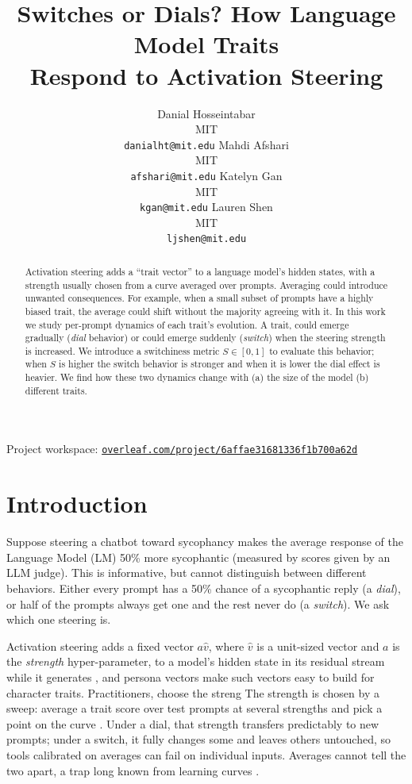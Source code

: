\documentclass{article}
\title{Switches or Dials? How Language Model Traits\\Respond to Activation Steering}
\date{}
\author{
  Danial Hosseintabar \\ MIT \\ \texttt{danialht@mit.edu}
  \And
  Mahdi Afshari \\ MIT \\ \texttt{afshari@mit.edu}
  \And
  Katelyn Gan \\ MIT \\ \texttt{kgan@mit.edu}
  \And
  Lauren Shen \\ MIT \\ \texttt{ljshen@mit.edu}
}
\begin{document}
\maketitle
\begin{center}\small Project workspace: \href{https://www.overleaf.com/project/6affae31681336f1b700a62d/share\#cf8fa3ce9a988f6a2a5c88ddf9eea1c586d020f3416d6e69}{\texttt{overleaf.com/project/6affae31681336f1b700a62d}}\end{center}\vspace{0.5em}




\begin{abstract}
Activation steering adds a ``trait vector'' to a language model's hidden states, with a strength usually chosen from a curve averaged over prompts. Averaging could introduce unwanted consequences. For example, when a small subset of prompts have a highly biased trait, the average could shift without the majority agreeing with it. In this work we study per-prompt dynamics of each trait's evolution.
A trait, could emerge gradually (\emph{dial} behavior) or could emerge suddenly (\emph{switch}) when the steering strength is increased.
We introduce a switchiness metric $S\in[0,1]$ to evaluate this behavior; when $S$ is higher the switch behavior is stronger and when it is lower the dial effect is heavier. We find how these two dynamics change with (a) the size of the model (b) different traits.
\end{abstract}

\section{Introduction}

Suppose steering a chatbot toward sycophancy makes the average response of the Language Model (LM) 50\% more sycophantic (measured by scores given by an LLM judge). This is informative, but cannot distinguish between different behaviors. Either every prompt has a 50\% chance of a sycophantic reply (a \emph{dial}), or half of the prompts always get one and the rest never do (a \emph{switch}). We ask which one steering is.

Activation steering adds a fixed vector $a \hat{v}$, where $\hat{v}$ is a unit-sized vector and $a$ is the \emph{strength} hyper-parameter, to a model's hidden state in its residual stream while it generates \cite{turner2023actadd,rimsky2024caa,zou2023repe}, and persona vectors \cite{chen2025persona} make such vectors easy to build for character traits. Practitioners, choose the streng The strength is chosen by a sweep: average a trait score over test prompts at several strengths and pick a point on the curve \cite{tan2024reliability,braun2025unreliability}. Under a dial, that strength transfers predictably to new prompts; under a switch, it fully changes some and leaves others untouched, so tools calibrated on averages can fail on individual inputs. Averages cannot tell the two apart, a trap long known from learning curves \cite{estes1956group,gallistel2004learning}.
\end{document}
